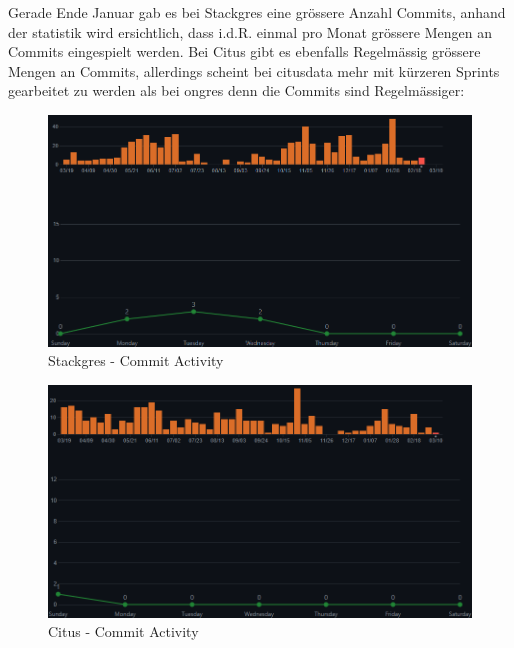 \begin{flushleft}
    Gerade Ende Januar gab es bei Stackgres eine grössere Anzahl Commits, anhand der statistik wird ersichtlich, dass i.d.R. einmal pro Monat grössere Mengen an Commits eingespielt werden.
    Bei Citus gibt es ebenfalls Regelmässig grössere Mengen an Commits, allerdings scheint bei citusdata mehr mit kürzeren Sprints gearbeitet zu werden als bei ongres denn die Commits sind Regelmässiger:
    \begin{figure}[H]
        \centering
        \includegraphics[width=0.75\linewidth]{source/implementation/evaluation/postgresql_ha_solutions/insights/stackgres_citus/commit_activity_ongres_stackgres}
        \caption{Stackgres - Commit Activity}
        \label{fig:commit_activity_ongres_stackgres}
    \end{figure}
    \begin{figure}[H]
        \centering
        \includegraphics[width=0.75\linewidth]{source/implementation/evaluation/postgresql_ha_solutions/insights/stackgres_citus/commit_activity_citusdata_citus}
        \caption{Citus - Commit Activity}
        \label{fig:commit_activity_citusdata_citus}
    \end{figure}


\end{flushleft}
